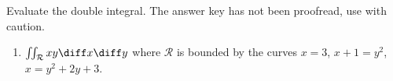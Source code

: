 Evaluate the double integral. The answer key has not been proofread, use with caution.

\begin{enumerate}
\item \label{problemintegralxydxdyoverx=3,x+1=y^2,x=y^2+2y+3} $\iint_{\mathcal R} xy \diff x\diff y$ where $\mathcal R$ is bounded by the curves $x=3 $, $x+1=y^2$, $x= y^2+2y+3$.

\end{enumerate}


